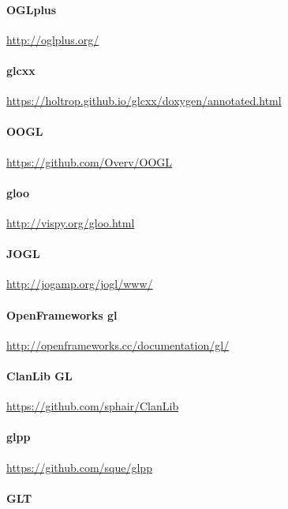 \documentclass{article}
\begin{document}
\paragraph{OGLplus}

\url{http://oglplus.org/}

\paragraph{glcxx}

\url{https://holtrop.github.io/glcxx/doxygen/annotated.html}

\paragraph{OOGL}

\url{https://github.com/Overv/OOGL}

\paragraph{gloo}

\url{http://vispy.org/gloo.html}

\paragraph{JOGL}

\url{http://jogamp.org/jogl/www/}

\paragraph{OpenFrameworks gl}

\url{http://openframeworks.cc/documentation/gl/}

\paragraph{ClanLib GL}

\url{https://github.com/sphair/ClanLib}

\paragraph{glpp}

\url{https://github.com/sque/glpp}

\paragraph{GLT}
\end{document}
